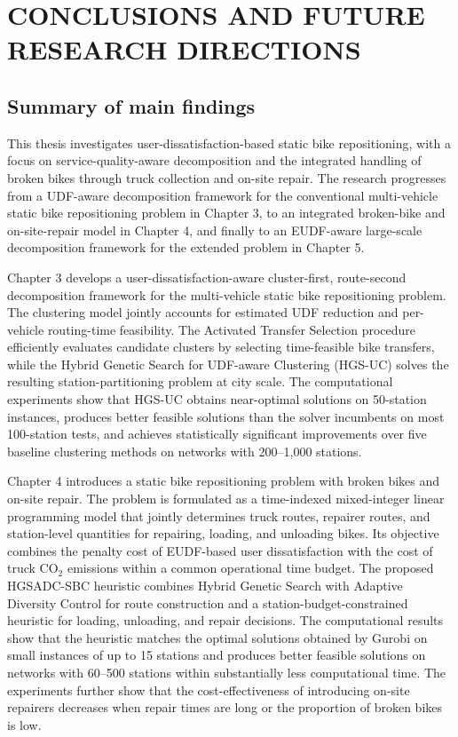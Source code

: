 \chapter{CONCLUSIONS AND FUTURE RESEARCH DIRECTIONS}

\section{Summary of main findings}

This thesis investigates user-dissatisfaction-based static bike repositioning, with a focus on service-quality-aware decomposition and the integrated handling of broken bikes through truck collection and on-site repair. The research progresses from a UDF-aware decomposition framework for the conventional multi-vehicle static bike repositioning problem in Chapter 3, to an integrated broken-bike and on-site-repair model in Chapter 4, and finally to an EUDF-aware large-scale decomposition framework for the extended problem in Chapter 5.

Chapter 3 develops a user-dissatisfaction-aware cluster-first, route-second decomposition framework for the multi-vehicle static bike repositioning problem. The clustering model jointly accounts for estimated UDF reduction and per-vehicle routing-time feasibility. The Activated Transfer Selection procedure efficiently evaluates candidate clusters by selecting time-feasible bike transfers, while the Hybrid Genetic Search for UDF-aware Clustering (HGS-UC) solves the resulting station-partitioning problem at city scale. The computational experiments show that HGS-UC obtains near-optimal solutions on 50-station instances, produces better feasible solutions than the solver incumbents on most 100-station tests, and achieves statistically significant improvements over five baseline clustering methods on networks with 200--1,000 stations.

Chapter 4 introduces a static bike repositioning problem with broken bikes and on-site repair. The problem is formulated as a time-indexed mixed-integer linear programming model that jointly determines truck routes, repairer routes, and station-level quantities for repairing, loading, and unloading bikes. Its objective combines the penalty cost of EUDF-based user dissatisfaction with the cost of truck CO$_2$ emissions within a common operational time budget. The proposed HGSADC-SBC heuristic combines Hybrid Genetic Search with Adaptive Diversity Control for route construction and a station-budget-constrained heuristic for loading, unloading, and repair decisions. The computational results show that the heuristic matches the optimal solutions obtained by Gurobi on small instances of up to 15 stations and produces better feasible solutions on networks with 60--500 stations within substantially less computational time. The experiments further show that the cost-effectiveness of introducing on-site repairers decreases when repair times are long or the proportion of broken bikes is low.

